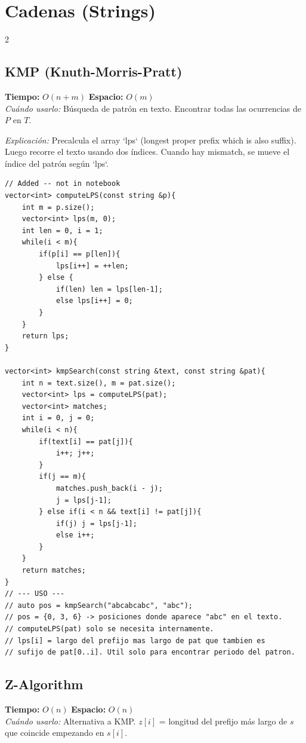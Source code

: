 \documentclass[10pt,a4paper]{article}
\begin{document}
\section{Cadenas (Strings)}
\begin{multicols}{2}

\subsection{KMP (Knuth-Morris-Pratt)}
\textbf{Tiempo:} $O(n + m)$ \quad \textbf{Espacio:} $O(m)$\\
\textit{Cu\'ando usarlo:} B\'usqueda de patr\'on en texto. Encontrar todas las ocurrencias de $P$ en $T$.

\textit{Explicación:} Precalcula el array `lps` (longest proper prefix which is also suffix). Luego recorre el texto usando dos índices. Cuando hay mismatch, se mueve el índice del patrón según `lps`.

\begin{lstlisting}
// Added -- not in notebook
vector<int> computeLPS(const string &p){
    int m = p.size();
    vector<int> lps(m, 0);
    int len = 0, i = 1;
    while(i < m){
        if(p[i] == p[len]){
            lps[i++] = ++len;
        } else {
            if(len) len = lps[len-1];
            else lps[i++] = 0;
        }
    }
    return lps;
}

vector<int> kmpSearch(const string &text, const string &pat){
    int n = text.size(), m = pat.size();
    vector<int> lps = computeLPS(pat);
    vector<int> matches;
    int i = 0, j = 0;
    while(i < n){
        if(text[i] == pat[j]){
            i++; j++;
        }
        if(j == m){
            matches.push_back(i - j);
            j = lps[j-1];
        } else if(i < n && text[i] != pat[j]){
            if(j) j = lps[j-1];
            else i++;
        }
    }
    return matches;
}
// --- USO ---
// auto pos = kmpSearch("abcabcabc", "abc");
// pos = {0, 3, 6} -> posiciones donde aparece "abc" en el texto.
// computeLPS(pat) solo se necesita internamente.
// lps[i] = largo del prefijo mas largo de pat que tambien es
// sufijo de pat[0..i]. Util solo para encontrar periodo del patron.
\end{lstlisting}

\subsection{Z-Algorithm}
\textbf{Tiempo:} $O(n)$ \quad \textbf{Espacio:} $O(n)$\\
\textit{Cu\'ando usarlo:} Alternativa a KMP. $z[i]$ = longitud del prefijo m\'as largo de $s$ que coincide empezando en $s[i]$.


\end{multicols}
\end{document}
